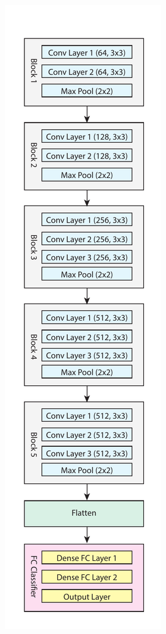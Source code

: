 \documentclass[a4paper, twocolumn]{article}
\begin{document}
\lipsum[1-17]

\begin{figure}
	\begin{subfigure}{0.16\textwidth}
		\includegraphics[width=\linewidth]{Figures/vgg_architecture}

\end{subfigure}
\end{figure}
\end{document}
